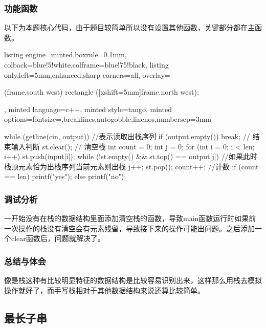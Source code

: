 \documentclass[12pt]{article}
\begin{document}
\subsubsection{功能函数}
{\songti 以下为本题核心代码，由于题目较简单所以没有设置其他函数，关键部分都在主函数。}

\begin{tcblisting}{listing engine=minted,boxrule=0.1mm,
colback=blue!5!white,colframe=blue!75!black,
listing only,left=5mm,enhanced,sharp corners=all,
overlay={\begin{tcbclipinterior} (frame.south west)
rectangle ([xshift=5mm]frame.north west);\end{tcbclipinterior}},
minted language=c++,
minted style=tango,
minted options={fontsize=\small,breaklines,autogobble,linenos,numbersep=3mm}}
while (getline(cin, output)) { //表示读取出栈序列
        if (output.empty()) break; // 结束输入判断
        st.clear(); // 清空栈
        int count = 0;
        int j = 0;
        for (int i = 0; i < len; i++) {
            st.push(input[i]);
            while (!st.empty() && st.top() == output[j]) { //如果此时栈顶元素恰为出栈序列当前元素则出栈
                j++;
                st.pop();
                count++;  //计数
            }
        }
        if (count == len) 
            printf("yes\n");
        else
            printf("no\n");
    }
\end{tcblisting}
\subsubsection{调试分析}
{\songti 一开始没有在栈的数据结构里面添加清空栈的函数，导致main函数运行时如果前一次操作的栈没有清空会有元素残留，导致接下来的操作可能出问题。之后添加一个clear函数后，问题就解决了。}
\subsubsection{总结与体会}
{\songti 像是栈这种有比较明显特征的数据结构是比较容易识别出来，这样那么用栈去模拟操作就好了，而手写栈相对于其他数据结构来说还算比较简单。}
\subsection{最长子串}
\end{document}
